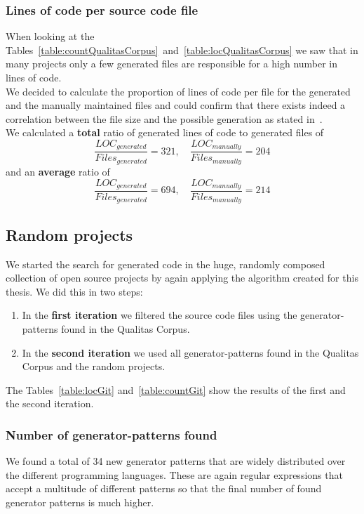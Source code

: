 \subsubsection{Lines of code per source code file}
When looking at the Tables~\ref{table:countQualitasCorpus}~and~\ref{table:locQualitasCorpus} we saw that in many projects only a few generated files are responsible for a high number in lines of code.\\
We decided to calculate the proportion of lines of code per file for the generated and the manually maintained files and could confirm that there exists indeed a correlation between the file size and the possible generation as stated in~\cite{Bernwieser2014}.\\
We calculated a \textbf{total} ratio of generated lines of code to generated files of 
\begin{equation}
	\frac{LOC_{generated}}{Files_{generated}} = 321 , \quad \frac{LOC_{manually}}{Files_{manually}} = 204
\end{equation}
and an \textbf{average} ratio of
\begin{equation}
	\frac{LOC_{generated}}{Files_{generated}} = 694 , \quad \frac{LOC_{manually}}{Files_{manually}} = 214
\end{equation}




\cleardoublepage{}
\subsection{Random projects}
We started the search for generated code in the huge, randomly composed collection of open source projects by again applying the algorithm created for this thesis. We did this in two steps:
\begin{enumerate}
	\item In the \textbf{first iteration} we filtered the source code files using the generator-patterns found in the Qualitas Corpus.
	\item In the \textbf{second iteration} we used all generator-patterns found in the Qualitas Corpus and the random projects.
\end{enumerate} 
The Tables~\ref{table:locGit} and~\ref{table:countGit} show the results of the first and the second iteration. 

\subsubsection{Number of generator-patterns found}
We found a total of 34 new generator patterns that are widely distributed over the different programming languages. These are again regular expressions that accept a multitude of different patterns so that the final number of found generator patterns is much higher.

